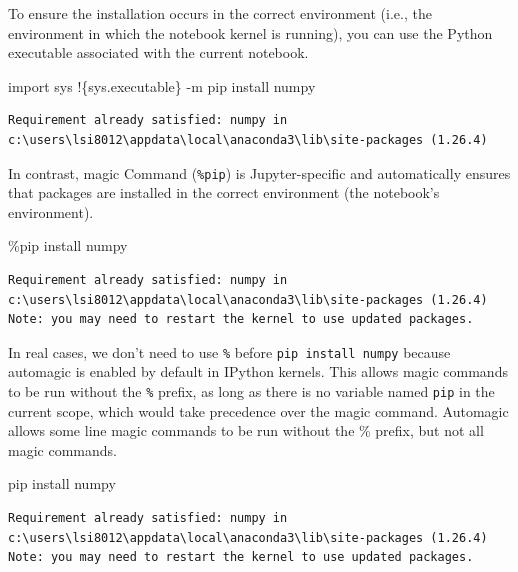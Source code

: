 \documentclass[
  letterpaper,
  DIV=11,
  numbers=noendperiod]{scrreprt}
\newenvironment{Shaded}{\begin{snugshade}}{\end{snugshade}}
\newcommand{\ImportTok}[1]{\textcolor[rgb]{0.00,0.46,0.62}{#1}}
\newcommand{\NormalTok}[1]{\textcolor[rgb]{0.00,0.23,0.31}{#1}}
\newcommand{\OperatorTok}[1]{\textcolor[rgb]{0.37,0.37,0.37}{#1}}
\begin{document}
To ensure the installation occurs in the correct environment (i.e., the
environment in which the notebook kernel is running), you can use the
Python executable associated with the current notebook.

\begin{Shaded}
\begin{Highlighting}[]
\ImportTok{import}\NormalTok{ sys}
\OperatorTok{!}\NormalTok{\{sys.executable\} }\OperatorTok{{-}}\NormalTok{m pip install numpy}
\end{Highlighting}
\end{Shaded}

\begin{verbatim}
Requirement already satisfied: numpy in c:\users\lsi8012\appdata\local\anaconda3\lib\site-packages (1.26.4)
\end{verbatim}

In contrast, magic Command (\texttt{\%pip}) is Jupyter-specific and
automatically ensures that packages are installed in the correct
environment (the notebook's environment).

\begin{Shaded}
\begin{Highlighting}[]
\OperatorTok{\%}\NormalTok{pip install numpy}
\end{Highlighting}
\end{Shaded}

\begin{verbatim}
Requirement already satisfied: numpy in c:\users\lsi8012\appdata\local\anaconda3\lib\site-packages (1.26.4)
Note: you may need to restart the kernel to use updated packages.
\end{verbatim}

In real cases, we don't need to use \texttt{\%} before
\texttt{pip\ install\ numpy} because automagic is enabled by default in
IPython kernels. This allows magic commands to be run without the
\texttt{\%} prefix, as long as there is no variable named \texttt{pip}
in the current scope, which would take precedence over the magic
command. Automagic allows some line magic commands to be run without the
\% prefix, but not all magic commands.

\begin{Shaded}
\begin{Highlighting}[]
\NormalTok{pip install numpy}
\end{Highlighting}
\end{Shaded}

\begin{verbatim}
Requirement already satisfied: numpy in c:\users\lsi8012\appdata\local\anaconda3\lib\site-packages (1.26.4)
Note: you may need to restart the kernel to use updated packages.
\end{verbatim}
\end{document}
